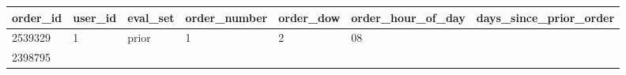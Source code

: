 \documentclass[11pt]{article}
\begin{document}
\begin{longtable}[]{@{}lllllll@{}}
\toprule
\begin{minipage}[b]{0.09\columnwidth}\raggedright
order\_id\strut
\end{minipage} & \begin{minipage}[b]{0.08\columnwidth}\raggedright
user\_id\strut
\end{minipage} & \begin{minipage}[b]{0.09\columnwidth}\raggedright
eval\_set\strut
\end{minipage} & \begin{minipage}[b]{0.12\columnwidth}\raggedright
order\_number\strut
\end{minipage} & \begin{minipage}[b]{0.09\columnwidth}\raggedright
order\_dow\strut
\end{minipage} & \begin{minipage}[b]{0.16\columnwidth}\raggedright
order\_hour\_of\_day\strut
\end{minipage} & \begin{minipage}[b]{0.19\columnwidth}\raggedright
days\_since\_prior\_order\strut
\end{minipage}\tabularnewline
\midrule
\endhead
\begin{minipage}[t]{0.09\columnwidth}\raggedright
2539329\strut
\end{minipage} & \begin{minipage}[t]{0.08\columnwidth}\raggedright
1\strut
\end{minipage} & \begin{minipage}[t]{0.09\columnwidth}\raggedright
prior\strut
\end{minipage} & \begin{minipage}[t]{0.12\columnwidth}\raggedright
1\strut
\end{minipage} & \begin{minipage}[t]{0.09\columnwidth}\raggedright
2\strut
\end{minipage} & \begin{minipage}[t]{0.16\columnwidth}\raggedright
08\strut
\end{minipage} & \begin{minipage}[t]{0.19\columnwidth}\raggedright
\strut
\end{minipage}\tabularnewline
\begin{minipage}[t]{0.09\columnwidth}\raggedright
2398795\strut
\end{minipage} & \begin{minipage}[t]{0.08\columnwidth}\raggedright

\end{minipage}
\end{longtable}
\end{document}
